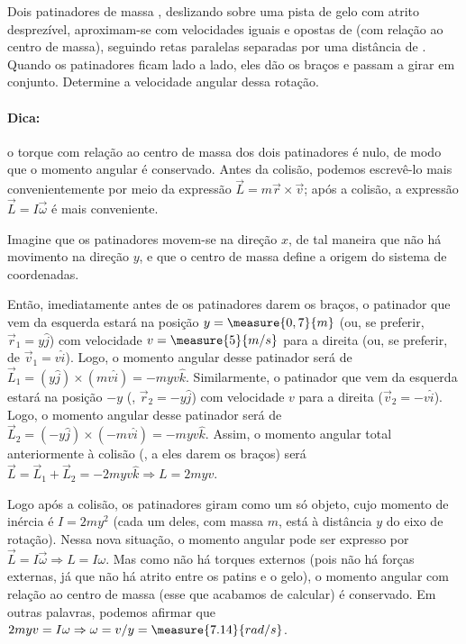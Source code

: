 \begin{question}
    Dois patinadores de massa , deslizando sobre uma pista de gelo com atrito desprezível, aproximam-se com velocidades iguais e opostas de  (com relação ao centro de massa), seguindo retas paralelas separadas por uma distância de .
    Quando os patinadores ficam lado a lado, eles dão os braços e passam a girar em conjunto.
    Determine a velocidade angular dessa rotação.

    \paragraph{Dica:} o torque com relação ao centro de massa dos dois patinadores é nulo, de modo que o momento angular é conservado.
    Antes da colisão, podemos escrevê-lo mais convenientemente por meio da expressão $\vec L = m \vec r \times \vec v$;
    após a colisão, a expressão $\vec L = I\vec \omega$ é mais conveniente.

    \begin{answer}
    \end{answer}
    
    \begin{solution}
      Imagine que os patinadores movem-se na direção $x$, de tal maneira que não há movimento na direção $y$, e que o centro de massa define a origem do sistema de coordenadas.


      Então, imediatamente antes de os patinadores darem os braços, o patinador que vem da esquerda estará na posição $y = \measure{0,7}{m}$ (ou, se preferir, $\vec r_1 = y\hat j$) com velocidade $v = \measure{5}{m/s}$ para a direita (ou, se preferir, de $\vec v_1 = v\hat i$).
      Logo, o momento angular desse patinador será de $\vec L_1 = (y\hat j) \times (mv\hat i) = -myv \hat k$.
      Similarmente, o patinador que vem da esquerda estará na posição $-y$ (\ie, $\vec r_2 = -y\hat j$) com velocidade $v$ para a direita ($\vec v_2 = -v\hat i$).
      Logo, o momento angular desse patinador será de $\vec L_2 = (-y\hat j) \times (-mv\hat i) = -myv \hat k$.
      Assim, o momento angular total anteriormente à colisão (\ie, a eles darem os braços) será $\vec L = \vec L_1 + \vec L_2 = -2myv\hat k \Rightarrow L = 2myv$.

      Logo após a colisão, os patinadores giram como um só objeto, cujo momento de inércia é $I = 2my^2$ (cada um deles, com massa $m$, está à distância $y$ do eixo de rotação).
      Nessa nova situação, o momento angular pode ser expresso por $\vec L = I\vec\omega \Rightarrow L = I\omega$.
      Mas como não há torques externos (pois não há forças externas, já que não há atrito entre os patins e o gelo), o momento angular com relação ao centro de massa (esse que acabamos de calcular) é conservado.
      Em outras palavras, podemos afirmar que $2myv = I\omega \Rightarrow \omega = v/y = \measure{7.14}{rad/s}$.
    \end{solution}
\end{question}